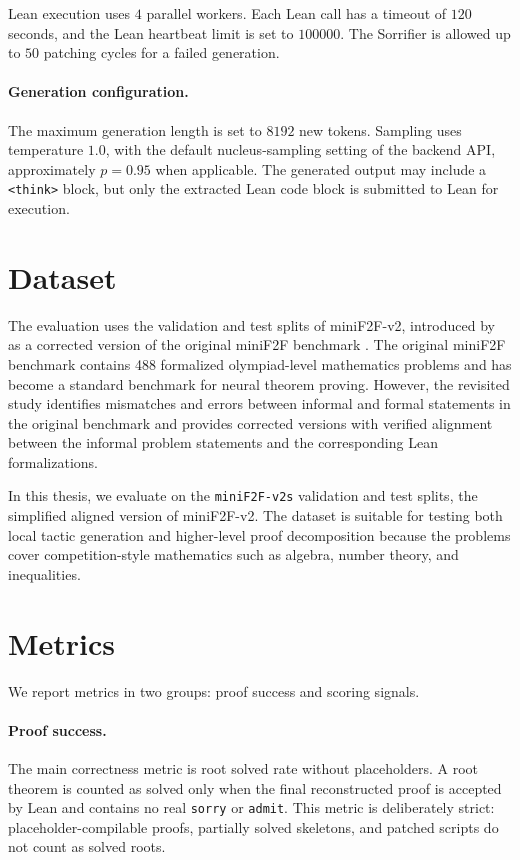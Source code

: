 Lean execution uses \(4\) parallel workers. Each Lean call has a timeout of \(120\) seconds, and the
Lean heartbeat limit is set to \(100000\). The Sorrifier is allowed up to \(50\) patching cycles for a
failed generation.

\paragraph{Generation configuration.}
The maximum generation length is set to \(8192\) new tokens. Sampling uses temperature \(1.0\), with
the default nucleus-sampling setting of the backend API, approximately \(p=0.95\) when applicable.
The generated output may include a \texttt{<think>} block, but only the extracted Lean code block is
submitted to Lean for execution.

\section{Dataset}

The evaluation uses the validation and test splits of miniF2F-v2, introduced by
\citet{ospanov2025minif2fLeanRevisited} as a corrected version of the original miniF2F benchmark
\citep{zheng2021minif2f}. The original miniF2F benchmark contains 488 formalized olympiad-level
mathematics problems and has become a standard benchmark for neural theorem proving. However,
the revisited study identifies mismatches and errors between informal and formal statements in the
original benchmark and provides corrected versions with verified alignment between the informal
problem statements and the corresponding Lean formalizations.

In this thesis, we evaluate on the \texttt{miniF2F-v2s} validation and test splits, the simplified aligned version of miniF2F-v2. The dataset is suitable for
testing both local tactic generation and higher-level proof decomposition because the problems cover
competition-style mathematics such as algebra, number theory, and inequalities.

\section{Metrics}

We report metrics in two groups: proof success and scoring signals.

\paragraph{Proof success.}
The main correctness metric is root solved rate without placeholders. A root theorem is counted as solved only when the final reconstructed proof is accepted by Lean and contains no real \texttt{sorry} or \texttt{admit}. This metric is deliberately strict: placeholder-compilable proofs, partially solved skeletons, and patched scripts do not count as solved roots.

